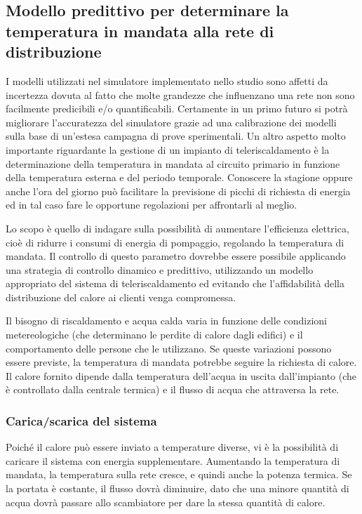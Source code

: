 \documentclass[laurea,oneside,11pt]{USiena_tesiLM}
\begin{document}
\subsection{Modello predittivo per determinare la temperatura in mandata alla rete di distribuzione}
I modelli utilizzati nel simulatore implementato nello studio sono affetti da incertezza dovuta al fatto che molte grandezze che influenzano una rete non sono facilmente predicibili e/o quantificabili.
Certamente in un primo futuro si potrà migliorare l'accuratezza del simulatore grazie ad una calibrazione dei modelli sulla base di un'estesa campagna di prove sperimentali. 
Un altro aspetto molto importante riguardante la gestione di un impianto di teleriscaldamento è la determinazione della temperatura in mandata al circuito primario in funzione della temperatura esterna e del periodo temporale. Conoscere la stagione oppure anche l'ora del giorno può facilitare la previsione di picchi di richiesta di energia ed in tal caso fare le opportune regolazioni per affrontarli al meglio.

Lo scopo è quello di indagare sulla possibilità di aumentare l'efficienza elettrica, cioè di ridurre i consumi di energia di pompaggio, regolando la temperatura di mandata.
Il controllo di questo parametro dovrebbe essere possibile applicando una strategia di controllo dinamico e predittivo, utilizzando un modello appropriato del sistema di teleriscaldamento ed evitando che l'affidabilità della distribuzione del calore ai clienti venga compromessa.

Il bisogno di riscaldamento e acqua calda varia in funzione delle condizioni metereologiche (che determinano le perdite di calore dagli edifici) e il comportamento delle persone che le utilizzano. Se queste variazioni possono essere previste, la temperatura di mandata potrebbe seguire la richiesta di calore. Il calore fornito  dipende dalla temperatura dell'acqua in uscita dall'impianto (che è controllato dalla centrale termica) e il flusso di acqua che attraversa la rete. 

\subsubsection{Carica/scarica del sistema}
Poiché il calore può essere inviato a temperature diverse, vi è la possibilità di caricare il sistema con energia supplementare.
Aumentando la temperatura di mandata, la temperatura sulla rete cresce, e quindi anche la potenza termica. Se la portata è costante, il flusso dovrà diminuire, dato che una minore quantità di acqua dovrà passare allo scambiatore per dare la stessa quantità di calore. 
\end{document}
